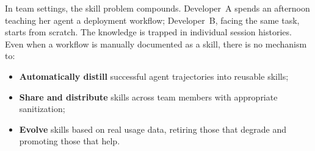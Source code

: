 \documentclass[11pt]{article}
\begin{document}
In team settings, the skill problem compounds. Developer~A spends an afternoon teaching her agent a deployment workflow; Developer~B, facing the same task, starts from scratch. The knowledge is trapped in individual session histories. Even when a workflow is manually documented as a skill, there is no mechanism to:
\begin{itemize}
    \item \textbf{Automatically distill} successful agent trajectories into reusable skills;
    \item \textbf{Share and distribute} skills across team members with appropriate sanitization;
    \item \textbf{Evolve} skills based on real usage data, retiring those that degrade and promoting those that help.
\end{itemize}
\end{document}

